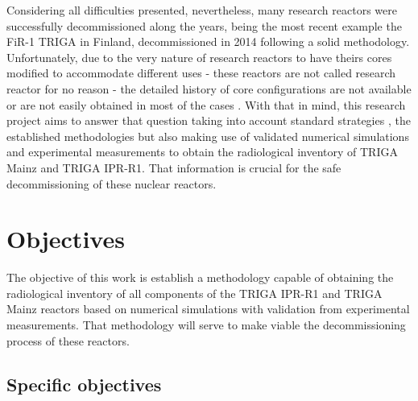 \documentclass[11pt]{article} %
\begin{document}
Considering all difficulties presented, nevertheless, many research reactors were successfully decommissioned along the years, being the most recent example the FiR-1 TRIGA in Finland, decommissioned in 2014 \cite{Raty_Thesis_2020} following a solid methodology. Unfortunately, due to the very nature of research reactors to have theirs cores modified to accommodate different uses - these reactors are not called research reactor for no reason - the detailed history of core configurations are not available or are not easily obtained in most of the cases \cite[p. 16-19]{Clean-up_CEA-e-DEN_2018}. With that in mind, this research project aims to answer that question taking into account standard strategies \cite{IAEA_TECDOC_2005}, the established methodologies \cite{Raty_2024} but also making use of validated numerical simulations and experimental measurements to obtain the radiological inventory of TRIGA Mainz and TRIGA IPR-R1. That information is crucial for the safe decommissioning of these nuclear reactors. %





\section{Objectives}

The objective of this work is establish a methodology capable of obtaining the radiological inventory of all components of the TRIGA IPR-R1 and TRIGA Mainz reactors based on numerical simulations with validation from experimental measurements. That methodology will serve to make viable the decommissioning process of these reactors. 



\subsection{Specific objectives}

\end{document}
